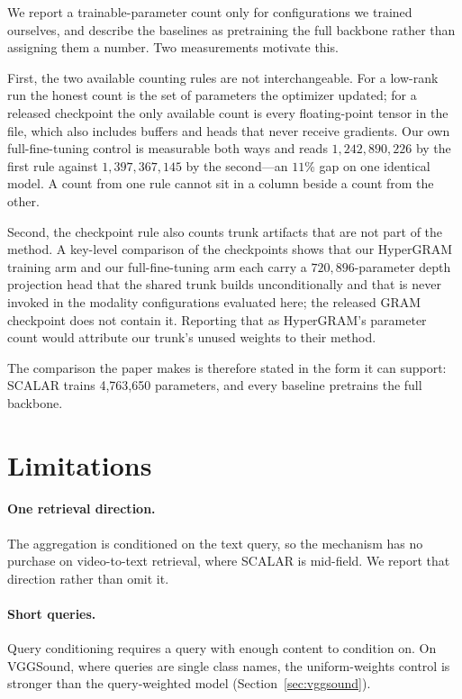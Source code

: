 \documentclass[10pt,twocolumn,letterpaper]{article}
\newcommand{\ours}{SCALAR}
\begin{document}
We report a trainable-parameter count only for configurations we trained
ourselves, and describe the baselines as pretraining the full backbone rather
than assigning them a number. Two measurements motivate this.

First, the two available counting rules are not interchangeable. For a low-rank
run the honest count is the set of parameters the optimizer updated; for a
released checkpoint the only available count is every floating-point tensor in
the file, which also includes buffers and heads that never receive gradients.
Our own full-fine-tuning control is measurable both ways and reads
$1{,}242{,}890{,}226$ by the first rule against $1{,}397{,}367{,}145$ by the
second---an $11\%$ gap on one identical model. A count from one rule cannot sit
in a column beside a count from the other.

Second, the checkpoint rule also counts trunk artifacts that are not part of the
method. A key-level comparison of the checkpoints shows that our HyperGRAM
training arm and our full-fine-tuning arm each carry a $720{,}896$-parameter
depth projection head that the shared trunk builds unconditionally and that is
never invoked in the modality configurations evaluated here; the released GRAM
checkpoint does not contain it. Reporting that as HyperGRAM's parameter count
would attribute our trunk's unused weights to their method.

The comparison the paper makes is therefore stated in the form it can support:
\ours{} trains 4{,}763{,}650 parameters, and every baseline pretrains the full
backbone.

\section{Limitations}
\label{sec:limits}

\paragraph{One retrieval direction.}
The aggregation is conditioned on the text query, so the mechanism has no
purchase on video-to-text retrieval, where \ours{} is mid-field. We report that
direction rather than omit it.

\paragraph{Short queries.}
Query conditioning requires a query with enough content to condition on. On
VGGSound, where queries are single class names, the uniform-weights control is
stronger than the query-weighted model (Section~\ref{sec:vggsound}).
\end{document}
